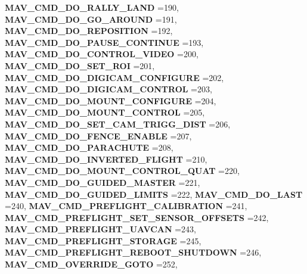 \begin{DoxyCompactItemize}
\textbf{ M\+A\+V\+\_\+\+C\+M\+D\+\_\+\+D\+O\+\_\+\+R\+A\+L\+L\+Y\+\_\+\+L\+A\+ND} =190, 
\textbf{ M\+A\+V\+\_\+\+C\+M\+D\+\_\+\+D\+O\+\_\+\+G\+O\+\_\+\+A\+R\+O\+U\+ND} =191, 
\textbf{ M\+A\+V\+\_\+\+C\+M\+D\+\_\+\+D\+O\+\_\+\+R\+E\+P\+O\+S\+I\+T\+I\+ON} =192, 
\newline
\textbf{ M\+A\+V\+\_\+\+C\+M\+D\+\_\+\+D\+O\+\_\+\+P\+A\+U\+S\+E\+\_\+\+C\+O\+N\+T\+I\+N\+UE} =193, 
\textbf{ M\+A\+V\+\_\+\+C\+M\+D\+\_\+\+D\+O\+\_\+\+C\+O\+N\+T\+R\+O\+L\+\_\+\+V\+I\+D\+EO} =200, 
\textbf{ M\+A\+V\+\_\+\+C\+M\+D\+\_\+\+D\+O\+\_\+\+S\+E\+T\+\_\+\+R\+OI} =201, 
\textbf{ M\+A\+V\+\_\+\+C\+M\+D\+\_\+\+D\+O\+\_\+\+D\+I\+G\+I\+C\+A\+M\+\_\+\+C\+O\+N\+F\+I\+G\+U\+RE} =202, 
\newline
\textbf{ M\+A\+V\+\_\+\+C\+M\+D\+\_\+\+D\+O\+\_\+\+D\+I\+G\+I\+C\+A\+M\+\_\+\+C\+O\+N\+T\+R\+OL} =203, 
\textbf{ M\+A\+V\+\_\+\+C\+M\+D\+\_\+\+D\+O\+\_\+\+M\+O\+U\+N\+T\+\_\+\+C\+O\+N\+F\+I\+G\+U\+RE} =204, 
\textbf{ M\+A\+V\+\_\+\+C\+M\+D\+\_\+\+D\+O\+\_\+\+M\+O\+U\+N\+T\+\_\+\+C\+O\+N\+T\+R\+OL} =205, 
\textbf{ M\+A\+V\+\_\+\+C\+M\+D\+\_\+\+D\+O\+\_\+\+S\+E\+T\+\_\+\+C\+A\+M\+\_\+\+T\+R\+I\+G\+G\+\_\+\+D\+I\+ST} =206, 
\newline
\textbf{ M\+A\+V\+\_\+\+C\+M\+D\+\_\+\+D\+O\+\_\+\+F\+E\+N\+C\+E\+\_\+\+E\+N\+A\+B\+LE} =207, 
\textbf{ M\+A\+V\+\_\+\+C\+M\+D\+\_\+\+D\+O\+\_\+\+P\+A\+R\+A\+C\+H\+U\+TE} =208, 
\textbf{ M\+A\+V\+\_\+\+C\+M\+D\+\_\+\+D\+O\+\_\+\+I\+N\+V\+E\+R\+T\+E\+D\+\_\+\+F\+L\+I\+G\+HT} =210, 
\textbf{ M\+A\+V\+\_\+\+C\+M\+D\+\_\+\+D\+O\+\_\+\+M\+O\+U\+N\+T\+\_\+\+C\+O\+N\+T\+R\+O\+L\+\_\+\+Q\+U\+AT} =220, 
\newline
\textbf{ M\+A\+V\+\_\+\+C\+M\+D\+\_\+\+D\+O\+\_\+\+G\+U\+I\+D\+E\+D\+\_\+\+M\+A\+S\+T\+ER} =221, 
\textbf{ M\+A\+V\+\_\+\+C\+M\+D\+\_\+\+D\+O\+\_\+\+G\+U\+I\+D\+E\+D\+\_\+\+L\+I\+M\+I\+TS} =222, 
\textbf{ M\+A\+V\+\_\+\+C\+M\+D\+\_\+\+D\+O\+\_\+\+L\+A\+ST} =240, 
\textbf{ M\+A\+V\+\_\+\+C\+M\+D\+\_\+\+P\+R\+E\+F\+L\+I\+G\+H\+T\+\_\+\+C\+A\+L\+I\+B\+R\+A\+T\+I\+ON} =241, 
\newline
\textbf{ M\+A\+V\+\_\+\+C\+M\+D\+\_\+\+P\+R\+E\+F\+L\+I\+G\+H\+T\+\_\+\+S\+E\+T\+\_\+\+S\+E\+N\+S\+O\+R\+\_\+\+O\+F\+F\+S\+E\+TS} =242, 
\textbf{ M\+A\+V\+\_\+\+C\+M\+D\+\_\+\+P\+R\+E\+F\+L\+I\+G\+H\+T\+\_\+\+U\+A\+V\+C\+AN} =243, 
\textbf{ M\+A\+V\+\_\+\+C\+M\+D\+\_\+\+P\+R\+E\+F\+L\+I\+G\+H\+T\+\_\+\+S\+T\+O\+R\+A\+GE} =245, 
\textbf{ M\+A\+V\+\_\+\+C\+M\+D\+\_\+\+P\+R\+E\+F\+L\+I\+G\+H\+T\+\_\+\+R\+E\+B\+O\+O\+T\+\_\+\+S\+H\+U\+T\+D\+O\+WN} =246, 
\newline
\textbf{ M\+A\+V\+\_\+\+C\+M\+D\+\_\+\+O\+V\+E\+R\+R\+I\+D\+E\+\_\+\+G\+O\+TO} =252, 

\end{DoxyCompactItemize}
